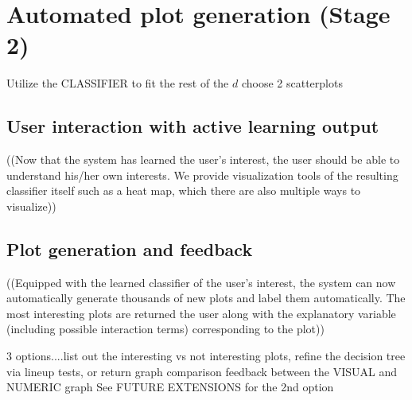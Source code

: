 \section{Automated plot generation (Stage 2)}
\label{sec:visualizer:plotgeneration}

Utilize the CLASSIFIER to fit the rest of the $d$ choose 2 scatterplots

\subsection{User interaction with active learning output}
\label{sec:visualizer:plotgeneration:user}

((Now that the system has learned the user’s interest, the user should be able to understand his/her own interests. We provide visualization tools of the resulting classifier itself such as a heat map, which there are also multiple ways to visualize))

\subsection{Plot generation and feedback}
\label{sec:visualizer:plotgeneration:feedback}

((Equipped with the learned classifier of the user’s interest, the system can now automatically generate thousands of new plots and label them automatically. The most interesting plots are returned the user along with the explanatory variable (including possible interaction terms) corresponding to the plot))

3 options....list out the interesting vs not interesting plots, refine the decision tree via lineup tests, or return graph comparison feedback between the VISUAL and NUMERIC graph
See FUTURE EXTENSIONS for the 2nd option